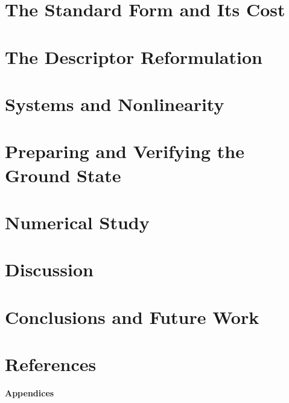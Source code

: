 \documentclass[12pt]{article}
\begin{document}
\section{The Standard Form and Its Cost}
\label{sec:standard}


\section{The Descriptor Reformulation}
\label{sec:descriptor}


\section{Systems and Nonlinearity}
\label{sec:extensions}


\section{Preparing and Verifying the Ground State}
\label{sec:pipeline}


\section{Numerical Study}
\label{sec:results}


\section{Discussion}
\label{sec:discussion}


\section{Conclusions and Future Work}
\label{sec:conclusions}


\newpage
\section{References}
\label{sec:ref}
\printbibliography[heading=none]

\clearpage
{}
{}

\thispagestyle{empty}
\vspace*{0.5cm}
\begin{center}
  {\Huge\bfseries Appendices\par}
\end{center}
\vspace{2cm}
\makeatletter
{}
\makeatother
\vspace*{\fill}
\clearpage

\appendix
{}%
%
%
\begingroup
  \let\StdAddContentsLine\addcontentsline
  \renewcommand{\addcontentsline}[3]{%
    \def\ThesisTocRedirectArg{#1}%
    \def\ThesisTocLabel{toc}%
    \ifx\ThesisTocRedirectArg\ThesisTocLabel
      \StdAddContentsLine{atoc}{#2}{#3}%
    \else
      \StdAddContentsLine{#1}{#2}{#3}%
    \fi
  }%
\endgroup
\end{document}
